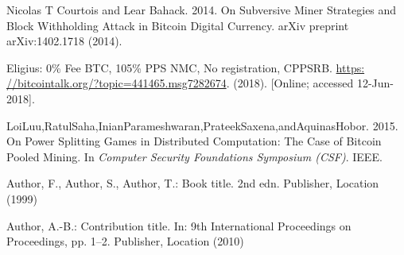 \documentclass[a4paper, 11pt]{article}
\begin{document}
\begin{CJK*}{UTF8}{gbsn}
\begin{thebibliography}{8}
    Nicolas T Courtois and Lear Bahack. 2014. 
    On Subversive Miner Strategies and Block Withholding Attack in Bitcoin Digital Currency. 
    arXiv preprint arXiv:1402.1718 (2014).

    Eligius: 0\% Fee BTC, 105\% PPS NMC, No registration, CPPSRB.
    \url{https: //bitcointalk.org/?topic=441465.msg7282674}.
    (2018).
    [Online; accessed 12-Jun-2018].

    LoiLuu,RatulSaha,InianParameshwaran,PrateekSaxena,andAquinasHobor. 2015. 
    On Power Splitting Games in Distributed Computation: The Case of Bitcoin Pooled Mining. 
    In \textit{Computer Security Foundations Symposium (CSF)}. IEEE.


    Author, F., Author, S., Author, T.: Book title. 2nd edn. Publisher,
    Location (1999)
    
    Author, A.-B.: Contribution title. In: 9th International Proceedings
    on Proceedings, pp. 1--2. Publisher, Location (2010)

    
    
    \end{thebibliography}
    
    \end{CJK*}
    
    
\end{document}
